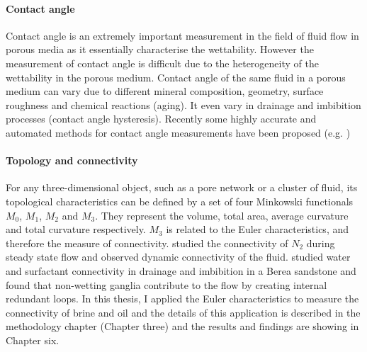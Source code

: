 \paragraph{Contact angle}
Contact angle is an extremely important measurement in the field of fluid flow in porous media as it essentially characterise the wettability. However the measurement of contact angle is difficult due to the heterogeneity of the wettability in the porous medium. Contact angle of the same fluid in a porous medium can vary due to different mineral composition, geometry, surface roughness and chemical reactions (aging). It even vary in drainage and imbibition processes (contact angle hysteresis). Recently some highly accurate and automated methods for contact angle measurements have been proposed (e.g. \citet{alratrout2018wettability,klise2016automated}) 

\paragraph{Topology and connectivity}
For any three-dimensional object, such as a pore network or a cluster of fluid, its topological characteristics can be defined by a set of four Minkowski functionals $M_0$, $M_1$, $M_2$ and $M_3$. They represent the volume, total area, average curvature and total curvature respectively. $M_3$ is related to the Euler characteristics, and therefore the measure of connectivity. \citet{reynolds2017dynamic} studied the connectivity of $N_2$ during steady state flow and observed dynamic connectivity of the fluid. \citet{khanamiri2018fluid} studied water and surfactant connectivity in drainage and imbibition in a Berea sandstone and found that non-wetting ganglia contribute to the flow by creating internal redundant loops. In this thesis, I applied the Euler characteristics to measure the connectivity of brine and oil and the details of this application is described in the methodology chapter (Chapter three) and the results and findings are showing in Chapter six.

